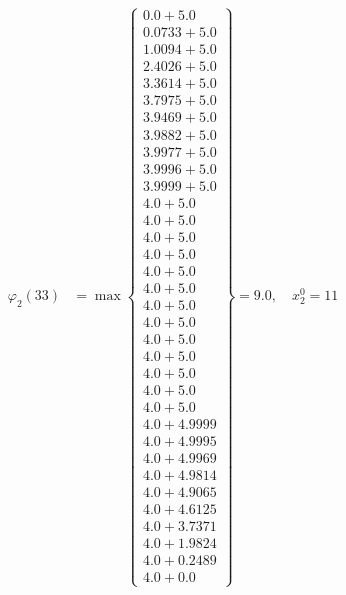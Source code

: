 \documentclass{article}
\begin{document}
\begin{align*}
  
\varphi_{2}(33) &= \max \left\{ \begin{array}{c}
0.0 + 5.0 \\
 0.0733 + 5.0 \\
 1.0094 + 5.0 \\
 2.4026 + 5.0 \\
 3.3614 + 5.0 \\
 3.7975 + 5.0 \\
 3.9469 + 5.0 \\
 3.9882 + 5.0 \\
 3.9977 + 5.0 \\
 3.9996 + 5.0 \\
 3.9999 + 5.0 \\
 4.0 + 5.0 \\
 4.0 + 5.0 \\
 4.0 + 5.0 \\
 4.0 + 5.0 \\
 4.0 + 5.0 \\
 4.0 + 5.0 \\
 4.0 + 5.0 \\
 4.0 + 5.0 \\
 4.0 + 5.0 \\
 4.0 + 5.0 \\
 4.0 + 5.0 \\
 4.0 + 5.0 \\
 4.0 + 5.0 \\
 4.0 + 4.9999 \\
 4.0 + 4.9995 \\
 4.0 + 4.9969 \\
 4.0 + 4.9814 \\
 4.0 + 4.9065 \\
 4.0 + 4.6125 \\
 4.0 + 3.7371 \\
 4.0 + 1.9824 \\
 4.0 + 0.2489 \\
 4.0 + 0.0
\end{array} \right\}=9.0,\quad x_{2}^0=11\\
  
  
  

\end{align*}
\end{document}

